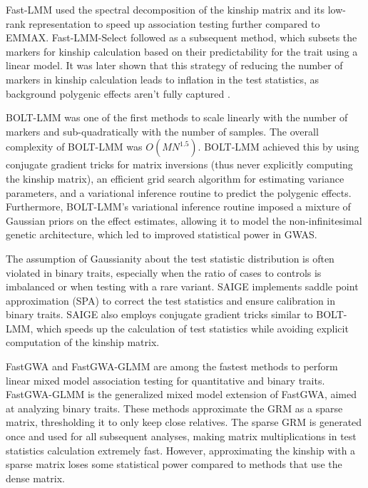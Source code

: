 Fast-LMM \cite{lippert2011fast} used the spectral decomposition of the kinship matrix and its low-rank representation to speed up association testing further compared to EMMAX. Fast-LMM-Select \cite{listgarten2013fast} followed as a subsequent method, which subsets the markers for kinship calculation based on their predictability for the trait using a linear model. It was later shown that this strategy of reducing the number of markers in kinship calculation leads to inflation in the test statistics, as background polygenic effects aren't fully captured \cite{yang2014advantages}.

BOLT-LMM \cite{loh2015efficient,loh2018mixed} was one of the first methods to scale linearly with the number of markers and sub-quadratically with the number of samples. The overall complexity of BOLT-LMM was \(O(MN^{1.5})\). BOLT-LMM achieved this by using conjugate gradient tricks for matrix inversions (thus never explicitly computing the kinship matrix), an efficient grid search algorithm for estimating variance parameters, and a variational inference routine to predict the polygenic effects. Furthermore, BOLT-LMM's variational inference routine imposed a mixture of Gaussian priors on the effect estimates, allowing it to model the non-infinitesimal genetic architecture, which led to improved statistical power in GWAS.

The assumption of Gaussianity about the test statistic distribution is often violated in binary traits, especially when the ratio of cases to controls is imbalanced or when testing with a rare variant. SAIGE \cite{zhou2018efficiently} implements saddle point approximation (SPA) \cite{kuonen1999miscellanea,dey2017fast} to correct the test statistics and ensure calibration in binary traits. SAIGE also employs conjugate gradient tricks similar to BOLT-LMM, which speeds up the calculation of test statistics while avoiding explicit computation of the kinship matrix.

FastGWA \cite{jiang2019resource} and FastGWA-GLMM \cite{jiang2021generalized} are among the fastest methods to perform linear mixed model association testing for quantitative and binary traits. FastGWA-GLMM is the generalized mixed model extension of FastGWA, aimed at analyzing binary traits. These methods approximate the GRM as a sparse matrix, thresholding it to only keep close relatives. The sparse GRM is generated once and used for all subsequent analyses, making matrix multiplications in test statistics calculation extremely fast. However, approximating the kinship with a sparse matrix loses some statistical power compared to methods that use the dense matrix.

